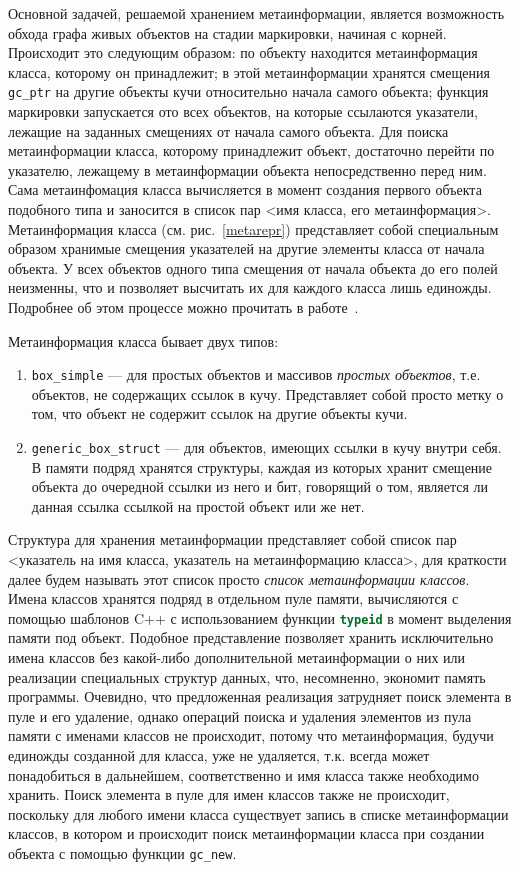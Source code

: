 Основной задачей, решаемой хранением метаинформации, является возможность обхода графа живых объектов на стадии маркировки,
начиная с корней. Происходит это следующим образом: по объекту находится метаинформация класса, которому он принадлежит;
в этой метаинформации хранятся смещения \lstinline[language= cpp]{gc_ptr} на другие объекты кучи относительно начала
самого объекта; функция маркировки запускается ото всех объектов, на которые ссылаются указатели,
лежащие на заданных смещениях от начала самого объекта.
Для поиска метаинформации класса, которому принадлежит объект, достаточно перейти по указателю, лежащему в метаинформации
объекта непосредственно перед ним.
Сама метаинфомация класса вычисляется в момент создания первого объекта подобного типа и заносится в список пар
<имя класса, его метаинформация>. Метаинформация класса (см. рис.~\ref{metarepr}) представляет собой специальным образом хранимые смещения
указателей на другие элементы класса от начала объекта. У всех объектов одного типа смещения от начала объекта до его полей
неизменны, что и позволяет высчитать их для каждого класса лишь единожды.
Подробнее об этом процессе можно прочитать в работе~\cite{kren}.

Метаинформация класса бывает двух типов:
\begin{enumerate}
\item \lstinline[language= cpp]{box_simple} --- для простых объектов и массивов \textit{простых объектов},
	т.е. объектов, не содержащих ссылок в кучу. Представляет собой просто метку о том, что объект не содержит ссылок на другие
	объекты кучи.
\item \lstinline[language= cpp]{generic_box_struct} --- для объектов, имеющих ссылки в кучу внутри себя.
	В памяти подряд хранятся структуры, каждая из которых хранит смещение объекта до очередной ссылки из него и бит,
	говорящий о том, является ли данная ссылка ссылкой на простой объект или же нет.
\end{enumerate}
Структура для хранения метаинформации представляет собой список пар <указатель на имя класса, указатель на метаинформацию класса>,
для краткости далее будем называть этот список просто \textit{список метаинформации классов}.
Имена классов хранятся подряд в отдельном пуле памяти, вычисляются с помощью шаблонов C++ с использованием
функции \lstinline[language= cpp]{typeid} в момент выделения памяти под объект.
Подобное представление позволяет хранить исключительно имена классов без какой-либо дополнительной метаинформации о них
или реализации специальных структур данных, что, несомненно, экономит память программы.
Очевидно, что предложенная реализация затрудняет поиск элемента в пуле и его удаление, однако
операций поиска и удаления элементов из пула памяти с именами классов не происходит, потому что метаинформация,
будучи единожды созданной для класса, уже не удаляется, т.к. всегда может понадобиться в дальнейшем, соответственно
и имя класса также необходимо хранить. Поиск элемента в пуле для имен классов также не происходит,
поскольку для любого имени класса существует запись в списке метаинформации классов, в котором и происходит
поиск метаинформации класса при создании объекта с помощью функции \lstinline[language= cpp]{gc_new}.


